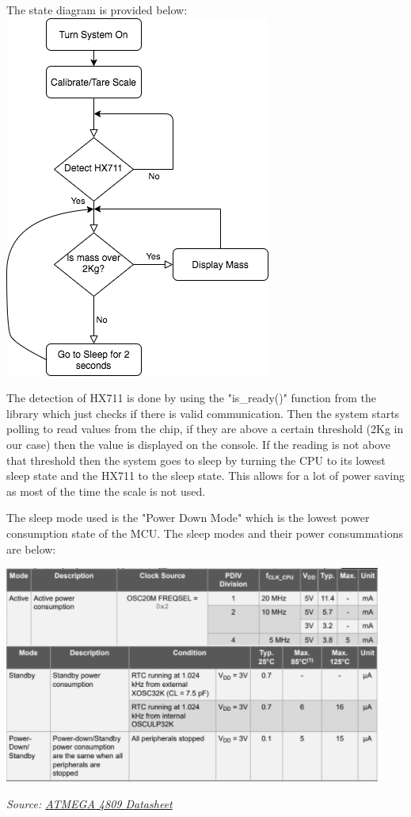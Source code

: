 \documentclass[letterpaper,11pt]{article}
\begin{document}
The state diagram is provided below:
\includegraphics[scale=.7]{Flow}

The detection of HX711 is done by using the "is\_ready()" function from the
library which just checks if there is valid communication. Then the system
starts polling to read values from the chip, if they are above a certain
threshold (2Kg in our case) then the value is displayed on the console. If the
reading is not above that threshold then the system goes to sleep by turning the
CPU to its lowest sleep state and the HX711 to the sleep state. This allows for
a lot of power saving as most of the time the scale is not used.

The sleep mode used is the "Power Down Mode" which is the lowest power
consumption state of the MCU. The sleep modes and their power consummations are
below:

{\center\includegraphics[scale=.7]{powermodes}\par}
{\textit{Source: \href{http://ww1.microchip.com/downloads/en/DeviceDoc/ATmega4808-4809-Data-Sheet-DS40002173A.pdf}{ATMEGA 4809 Datasheet}}}
\end{document}
